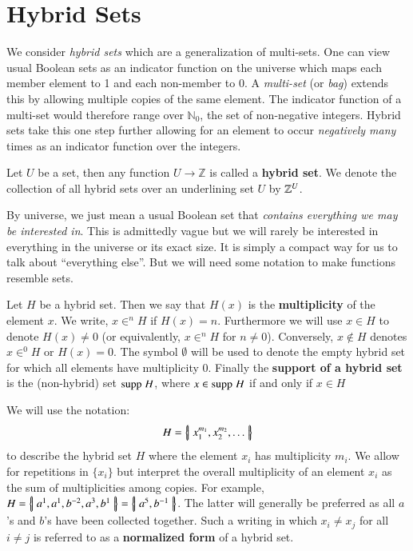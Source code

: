 \section{Hybrid Sets}


We consider \emph{hybrid sets} which are a generalization of multi-sets.
One can view usual Boolean sets as an indicator function on the universe
which maps each member element to 1 and each non-member to 0.
A \emph{multi-set} (or \emph{bag}) extends this by allowing multiple copies of the same element.
The indicator function of a multi-set would therefore range over $\mathbb{N}_0$, the set of non-negative integers.
Hybrid sets take this one step further allowing for an element to occur \emph{negatively many} times 
as an indicator function over the integers.


\begin{definition}
	Let $U$ be a set, then any function $U \to \mathbb{Z}$ is called a \textbf{hybrid set}.
	We denote the collection of all hybrid sets over an underlining set $U$ by $\hsetover[U]$.
\end{definition}


By universe, we just mean a usual Boolean set that \emph{contains everything we may be interested in}.
This is admittedly vague but we will rarely be interested in everything in the universe or its exact size.
It is simply a compact way for us to talk about ``everything else''.
But we will need some notation to make functions resemble sets.


\begin{definition}
	Let $H$ be a hybrid set. 
	Then we say that $H(x)$ is the \textbf{multiplicity} of the element $x$. 
	We write, $x \in^n H$ if $H(x)=n$. 
	Furthermore we will use $x \in H$ to denote $H(x)\neq 0$ (or equivalently, $x \in^n H$ for $n\neq 0$).
	Conversely, $x \notin H$ denotes $x \in^0 H$ or $H(x)=0$.
	The symbol $\emptyset$ will be used to denote the empty hybrid set for which all elements have multiplicity 0.
	Finally the \textbf{support of a hybrid set} is the (non-hybrid) set $\text{supp}\;H$,
	where $x \in \text{supp}\;H$ if and only if $x \in H$
\end{definition}


We will use the notation:
\begin{equation*}
	H = \left\{ \! \left| \; x_1^{m_1}, x_2^{m_2},\ldots \; \right| \! \right\}
\end{equation*}
to describe the hybrid set $H$ where the element $x_i$ has multiplicity $m_i$. 
We allow for repetitions in $\{ x_i \}$ but interpret the overall multiplicity of an element $x_i$ as 
the sum of multiplicities among copies. 
For example, $H=\left\{ \! \left| \; a^1, a^1, b^{-2}, a^3, b^1 \; \right| \! \right\} = \left\{ \! \left| \; a^5, b^{-1} \; \right| \! \right\}$. 
The latter will generally be preferred as all $a$'s and $b$'s have been collected together.
Such a writing in which $x_i \neq x_j$ for all $i \neq j$ is referred to as a \textbf{normalized form} of a hybrid set. 


